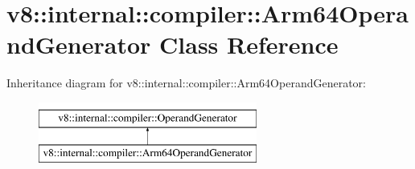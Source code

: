 \hypertarget{classv8_1_1internal_1_1compiler_1_1Arm64OperandGenerator}{}\section{v8\+:\+:internal\+:\+:compiler\+:\+:Arm64\+Operand\+Generator Class Reference}
\label{classv8_1_1internal_1_1compiler_1_1Arm64OperandGenerator}
Inheritance diagram for v8\+:\+:internal\+:\+:compiler\+:\+:Arm64\+Operand\+Generator\+:\begin{figure}[H]
\begin{center}
\leavevmode
\includegraphics[height=2.000000cm]{classv8_1_1internal_1_1compiler_1_1Arm64OperandGenerator}
\end{center}
\end{figure}
